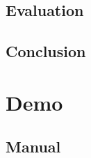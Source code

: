 \documentclass[ twoside,openright,titlepage,numbers=noenddot,headinclude,%
                footinclude=true,cleardoublepage=empty,abstractoff, %
                BCOR=5mm,paper=a4,fontsize=11pt,%
                ngerman,american,%
                ]{scrreprt}
\begin{document}


%
%


\chapter{Evaluation}
\label{cha:evaluation}


\chapter{Conclusion}
\label{cha:conclusion}

\part{Demo}
\label{part:demo}
\chapter{Manual}
\label{cha:manual}

\cleardoublepage
\end{document}
